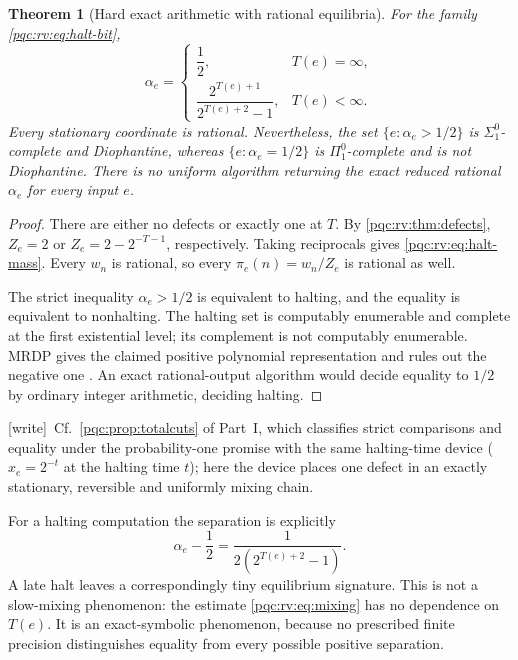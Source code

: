 \documentclass[11pt,letterpaper]{article}
\numberwithin{equation}{section}
\newtheorem{theorem}{Theorem}[section]
\theoremstyle{definition}
\theoremstyle{remark}
\newcommand{\wtag}{\textup{[write]}}
\begin{document}
\begin{theorem}[Hard exact arithmetic with rational equilibria]\label{pqc:rv:thm:halting}
For the family \cref{pqc:rv:eq:halt-bit},
\begin{equation}\label{pqc:rv:eq:halt-mass}
 \alpha_e=\begin{cases}
  \dfrac12,&T(e)=\infty,\\[4pt]
  \dfrac{2^{T(e)+1}}{2^{T(e)+2}-1},&T(e)<\infty.
 \end{cases}
\end{equation}
Every stationary coordinate is rational. Nevertheless, the set
$\{e:\alpha_e>1/2\}$ is $\Sigma^0_1$-complete and Diophantine,
whereas $\{e:\alpha_e=1/2\}$ is $\Pi^0_1$-complete and is not
Diophantine. There is no uniform algorithm returning the exact reduced
rational $\alpha_e$ for every input $e$.
\end{theorem}
\begin{proof}
There are either no defects or exactly one at $T$. By
\cref{pqc:rv:thm:defects}, $Z_e=2$ or $Z_e=2-2^{-T-1}$, respectively.
Taking reciprocals gives \cref{pqc:rv:eq:halt-mass}. Every $w_n$ is rational,
so every $\pi_e(n)=w_n/Z_e$ is rational as well.

The strict inequality $\alpha_e>1/2$ is equivalent to halting, and
the equality is equivalent to nonhalting. The halting set is
computably enumerable and complete at the first existential level;
its complement is not computably enumerable. MRDP gives the claimed
positive polynomial representation and rules out the negative one
\cite{b62s17-proveit-mrdp}. An exact rational-output algorithm would decide
equality to $1/2$ by ordinary integer arithmetic, deciding halting.
\end{proof}
\wtag\ Cf.\ \cref{pqc:prop:totalcuts} of Part~I, which classifies strict comparisons and equality under the probability-one promise with the same halting-time device ($x_e=2^{-t}$ at the halting time $t$); here the device places one defect in an exactly stationary, reversible and uniformly mixing chain.

For a halting computation the separation is explicitly
\begin{equation}\label{pqc:rv:eq:separation}
 \alpha_e-\frac12=\frac{1}{2(2^{T(e)+2}-1)}.
\end{equation}
A late halt leaves a correspondingly tiny equilibrium signature. This
is not a slow-mixing phenomenon: the estimate \cref{pqc:rv:eq:mixing} has
no dependence on $T(e)$. It is an exact-symbolic phenomenon, because
no prescribed finite precision distinguishes equality from every
possible positive separation.
\end{document}
